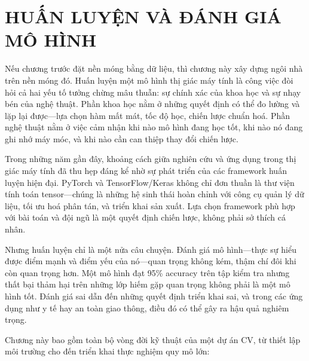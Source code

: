 \chapter{HUẤN LUYỆN VÀ ĐÁNH GIÁ MÔ HÌNH}
\label{chap:p2_training}

Nếu chương trước đặt nền móng bằng dữ liệu, thì chương này xây dựng ngôi nhà trên nền móng đó. Huấn luyện một mô hình thị giác máy tính là công việc đòi hỏi cả hai yếu tố tưởng chừng mâu thuẫn: sự chính xác của khoa học và sự nhạy bén của nghệ thuật. Phần khoa học nằm ở những quyết định có thể đo lường và lặp lại được---lựa chọn hàm mất mát, tốc độ học, chiến lược chuẩn hoá. Phần nghệ thuật nằm ở việc cảm nhận khi nào mô hình đang học tốt, khi nào nó đang ghi nhớ máy móc, và khi nào cần can thiệp thay đổi chiến lược.

Trong những năm gần đây, khoảng cách giữa nghiên cứu và ứng dụng trong thị giác máy tính đã thu hẹp đáng kể nhờ sự phát triển của các framework huấn luyện hiện đại. PyTorch và TensorFlow/Keras không chỉ đơn thuần là thư viện tính toán tensor---chúng là những hệ sinh thái hoàn chỉnh với công cụ quản lý dữ liệu, tối ưu hoá phân tán, và triển khai sản xuất. Lựa chọn framework phù hợp với bài toán và đội ngũ là một quyết định chiến lược, không phải sở thích cá nhân.

Nhưng huấn luyện chỉ là một nửa câu chuyện. Đánh giá mô hình---thực sự hiểu được điểm mạnh và điểm yếu của nó---quan trọng không kém, thậm chí đôi khi còn quan trọng hơn. Một mô hình đạt 95\% accuracy trên tập kiểm tra nhưng thất bại thảm hại trên những lớp hiếm gặp quan trọng không phải là một mô hình tốt. Đánh giá sai dẫn đến những quyết định triển khai sai, và trong các ứng dụng như y tế hay an toàn giao thông, điều đó có thể gây ra hậu quả nghiêm trọng.

Chương này bao gồm toàn bộ vòng đời kỹ thuật của một dự án CV, từ thiết lập môi trường cho đến triển khai thực nghiệm quy mô lớn:

